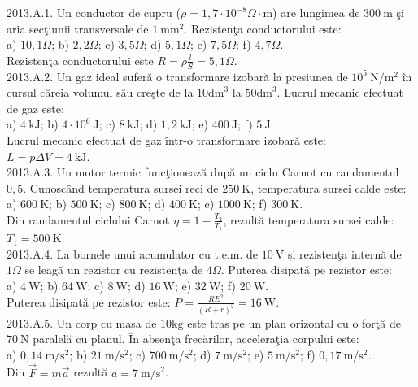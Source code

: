 
2013.A.1. Un conductor de cupru ($\rho=1,7 \cdot 10^{-8} \Omega \cdot \mathrm{m}$) are lungimea de $300 \mathrm{~m}$ şi aria secţiunii transversale de $1 \mathrm{~mm}^{2}$. Rezistenţa conductorului este:\\ a) $10,1 \Omega$; b) $2,2 \Omega$; c) $3,5 \Omega$; d) $5,1 \Omega$; e) $7,5 \Omega$; f) $4,7 \Omega$.\\ Rezistenţa conductorului este $R=\rho \frac{l}{S}=5,1 \Omega$.\\

2013.A.2. Un gaz ideal suferă o transformare izobară la presiunea de $10^{5} \mathrm{~N} / \mathrm{m}^{2}$ în cursul căreia volumul său creşte de la $10 \mathrm{dm}^{3}$ la $50 \mathrm{dm}^{3}$. Lucrul mecanic efectuat de gaz este:\\ a) $4 \mathrm{~kJ}$; b) $4 \cdot 10^{6} \mathrm{~J}$; c) $8 \mathrm{~kJ}$; d) $1,2 \mathrm{~kJ}$; e) $400 \mathrm{~J}$; f) $5 \mathrm{~J}$.\\ Lucrul mecanic efectuat de gaz într-o transformare izobară este:\\ $L=p \Delta V=4 \mathrm{~kJ}$.\\

2013.A.3. Un motor termic funcţionează după un ciclu Carnot cu randamentul $0,5$. Cunoscând temperatura sursei reci de $250 \mathrm{~K}$, temperatura sursei calde este:\\ a) $600 \mathrm{~K}$; b) $500 \mathrm{~K}$; c) $800 \mathrm{~K}$; d) $400 \mathrm{~K}$; e) $1000 \mathrm{~K}$; f) $300 \mathrm{~K}$.\\ Din randamentul ciclului Carnot $\eta=1-\frac{T_{2}}{T_{1}}$, rezultă temperatura sursei calde:\\ $T_{1}=500 \mathrm{~K}$.\\

2013.A.4. La bornele unui acumulator cu t.e.m. de $10 \mathrm{~V}$ și rezistenţa internă de $1 \Omega$ se leagă un rezistor cu rezistenţa de $4 \Omega$. Puterea disipată pe rezistor este:\\ a) $4 \mathrm{~W}$; b) $64 \mathrm{~W}$; c) $8 \mathrm{~W}$; d) $16 \mathrm{~W}$; e) $32 \mathrm{~W}$; f) $20 \mathrm{~W}$.\\ Puterea disipată pe rezistor este: $P=\frac{R E^{2}}{(R+r)^{2}}=16 \mathrm{~W}$.\\

2013.A.5. Un corp cu masa de $10 \mathrm{kg}$ este tras pe un plan orizontal cu o forţă de $70 \mathrm{~N}$ paralelă cu planul. În absenţa frecărilor, acceleraţia corpului este:\\ a) $0,14 \mathrm{~m} / \mathrm{s}^{2}$; b) $21 \mathrm{~m} / \mathrm{s}^{2}$; c) $700 \mathrm{~m} / \mathrm{s}^{2}$; d) $7 \mathrm{~m} / \mathrm{s}^{2}$; e) $5 \mathrm{~m} / \mathrm{s}^{2}$; f) $0,17 \mathrm{~m} / \mathrm{s}^{2}$.\\ Din $\vec{F}=m \vec{a}$ rezultă $a=7 \mathrm{~m} / \mathrm{s}^{2}$.\\

